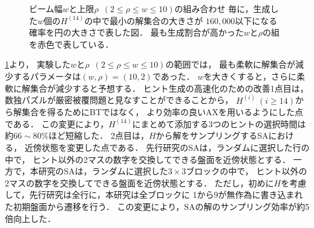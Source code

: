 \documentclass[a4paper, 9pt]{jarticle}
\begin{document}
\begin{論文概要}
\begin{figure}[bt]
  \caption{ビーム幅$w$と上限$\rho$~$(2 \leq \rho \leq w \leq 10)$の組み合わせ
  毎に，生成した$w$個の$H^{(14)}$の中で最小の解集合の大きさが
  $160,000$以下になる確率を円の大きさで表した図．
  最も生成割合が高かった$w$と$\rho$の組を赤色で表している．} 
  \label{fig:best_beam_width_and_rho}
\end{figure}
\figurename{\ref{fig:best_beam_width_and_rho}}より，
実験した$w$と$\rho$~$(2 \leq \rho \leq w \leq 10)$の範囲では，
最も柔軟に解集合が減少するパラメータは$(w, \rho) = (10, 2)$であった．
$w$を大きくすると，さらに柔軟に解集合が減少すると予想する．
ヒント生成の高速化のための改善1点目は，
数独パズルが厳密被覆問題と見なすことができることから，
$H^{(i)} ~ (i \geq 14)$から解集合を得るためにBTではなく，
より効率の良いAXを用いるようにした点である．
この変更により，$H^{(14)}$にまとめて添加する3つのヒントの選択時間は
約$66 \sim 80$\%ほど短縮した．
2点目は，$H$から解をサンプリングするSAにおける，
近傍状態を変更した点である．
先行研究のSAは，ランダムに選択した行の中で，
ヒント以外の2マスの数字を交換してできる盤面を近傍状態とする．
一方で，本研究のSAは，ランダムに選択した$3 \times 3$ブロックの中で，
ヒント以外の2マスの数字を交換してできる盤面を近傍状態とする．
ただし，初めに$H$を考慮して，先行研究は全行に，本研究は全ブロックに
1から9が無作為に書き込まれた初期盤面から遷移を行う．
この変更により，SAの解のサンプリング効率が約5倍向上した．


\end{論文概要}
\end{document}
